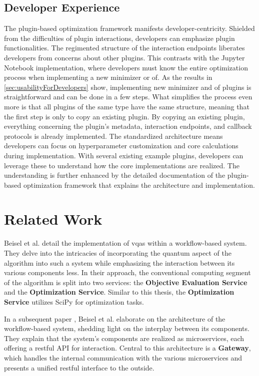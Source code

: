 \documentclass[
  a4paper,  %
  twoside,  %
  bibliography=totoc,
  headsepline,
  cleardoublepage=empty,
  parskip=half,
  draft=false
]{scrbook}
\begin{document}
\section{Developer Experience}
\label{sec:developerUsabilityAssessment}

The plugin-based optimization framework manifests developer-centricity.
Shielded from the difficulties of plugin interactions, developers can emphasize plugin functionalities.
The regimented structure of the interaction endpoints liberates developers from concerns about other plugins.
This contrasts with the Jupyter Notebook implementation, where developers must know the entire optimization process when implementing a new minimizer or \gls{of}.
As the results in \ref{sec:usabilityForDevelopers} show, implementing new minimizer and \gls{of} plugins is straightforward and can be done in a few steps.
What simplifies the process even more is that all plugins of the same type have the same structure, meaning that the first step is only to copy an existing plugin.
By copying an existing plugin, everything concerning the plugin's metadata, interaction endpoints, and callback protocols is already implemented.
The standardized architecture means developers can focus on hyperparameter customization and core calculations during implementation.
With several existing example plugins, developers can leverage these to understand how the core implementations are realized.
The understanding is further enhanced by the detailed documentation of the plugin-based optimization framework that explains the architecture and implementation.


\chapter{Related Work}
\label{chap:relatedWork}

Beisel et al. \cite{Beisel2023} detail the implementation of \glspl{vqa} within a workflow-based system.
They delve into the intricacies of incorporating the quantum aspect of the algorithm into such a system while emphasizing the interaction between its various components less.
In their approach, the conventional computing segment of the algorithm is split into two services: the \textbf{Objective Evaluation Service} and the \textbf{Optimization Service}.
Similar to this thesis, the \textbf{Optimization Service} utilizes SciPy for optimization tasks.

In a subsequent paper \cite{Beisel2023a}, Beisel et al. elaborate on the architecture of the workflow-based system, shedding light on the interplay between its components.
They explain that the system's components are realized as microservices, each offering a \gls{rest}ful API for interaction.
Central to this architecture is a \textbf{Gateway}, which handles the internal communication with the various microservices and presents a unified \gls{rest}ful interface to the outside.
\end{document}
